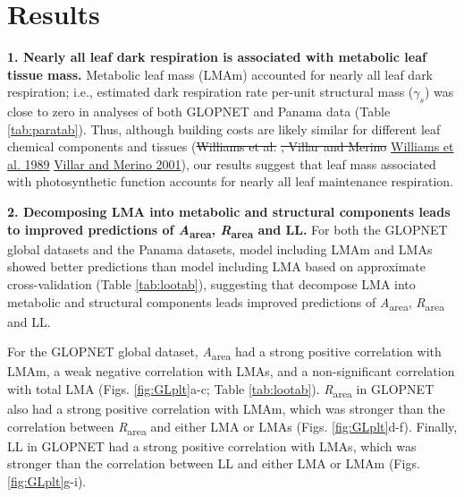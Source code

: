 \documentclass[
  12pt,
]{article}
\providecommand{\DIFaddtex}[1]{{\protect\color{blue}\uwave{#1}}} %
\providecommand{\DIFdeltex}[1]{{\protect\color{red}\sout{#1}}}                      %
\providecommand{\DIFaddbegin}{} %
\providecommand{\DIFaddend}{} %
\providecommand{\DIFdelbegin}{} %
\providecommand{\DIFdelend}{} %
\providecommand{\DIFadd}[1]{\texorpdfstring{\DIFaddtex{#1}}{#1}} %
\providecommand{\DIFdel}[1]{\texorpdfstring{\DIFdeltex{#1}}{}} %
\newcommand{\DIFscaledelfig}{0.5}
\newlength{\DIFdelgraphicswidth} %
\newlength{\DIFdelgraphicsheight} %
\newcommand{\DIFaddincludegraphics}[2][]{{\color{blue}\fbox{\DIFOincludegraphics[#1]{#2}}}} %
\newcommand{\DIFdelincludegraphics}[2][]{%
\sbox{\DIFdelgraphicsbox}{\DIFOincludegraphics[#1]{#2}}%
\settoboxwidth{\DIFdelgraphicswidth}{\DIFdelgraphicsbox} %
\settoboxtotalheight{\DIFdelgraphicsheight}{\DIFdelgraphicsbox} %
\scalebox{\DIFscaledelfig}{%
\parbox[b]{\DIFdelgraphicswidth}{\usebox{\DIFdelgraphicsbox}\\[-\baselineskip] \rule{\DIFdelgraphicswidth}{0em}}\llap{\resizebox{\DIFdelgraphicswidth}{\DIFdelgraphicsheight}{%
\setlength{\unitlength}{\DIFdelgraphicswidth}%
\begin{picture}(1,1)%
\thicklines\linethickness{2pt} %
{\color[rgb]{1,0,0}\put(0,0){\framebox(1,1){}}}%
{\color[rgb]{1,0,0}\put(0,0){\line( 1,1){1}}}%
{\color[rgb]{1,0,0}\put(0,1){\line(1,-1){1}}}%
\end{picture}%
}\hspace*{3pt}}} %
} %
\DeclareRobustCommand{\DIFaddbegin}{\DIFOaddbegin \let\includegraphics\DIFaddincludegraphics} %
\DeclareRobustCommand{\DIFaddend}{\DIFOaddend \let\includegraphics\DIFOincludegraphics} %
\DeclareRobustCommand{\DIFdelbegin}{\DIFOdelbegin \let\includegraphics\DIFdelincludegraphics} %
\DeclareRobustCommand{\DIFdelend}{\DIFOaddend \let\includegraphics\DIFOincludegraphics} %
\begin{document}
\hypertarget{results}{%
\section{Results}\label{results}}

\textbf{1. Nearly all leaf dark respiration is associated with metabolic leaf tissue mass.}
Metabolic leaf mass (LMAm) accounted for nearly all leaf dark respiration; i.e., estimated dark respiration rate per-unit structural mass (\(\gamma_s\)) was close to zero in analyses of both GLOPNET and Panama data (Table \ref{tab:paratab}).
Thus, although building costs are likely similar for different leaf chemical components and tissues (\DIFdelbegin \DIFdel{Williams et al. }\DIFdelend \protect\DIFdelbegin %
\DIFdel{, Villar and Merino }\DIFdelend \DIFaddbegin \hyperlink{ref-Williams1989}{Williams et al. 1989}\DIFadd{, }\DIFaddend \protect\DIFdelbegin %
\DIFdelend \DIFaddbegin \hyperlink{ref-Villar2001}{Villar and Merino 2001}\DIFaddend ), our results suggest that leaf mass associated with photosynthetic function accounts for nearly all leaf maintenance respiration.

\textbf{2. Decomposing LMA into metabolic and structural components leads to improved predictions of \emph{A}\textsubscript{area}, \emph{R}\textsubscript{area} and LL.}
For both the GLOPNET global datasets and the Panama datasets, model including LMAm and LMAs showed better predictions than model including LMA based on approximate cross-validation (Table \ref{tab:lootab}), suggesting that decompose LMA into metabolic and structural components leads improved predictions of \emph{A}\textsubscript{area}, \emph{R}\textsubscript{area} and LL.

For the GLOPNET global dataset, \emph{A}\textsubscript{area} had a strong positive correlation with LMAm, a weak negative correlation with LMAs, and a non-significant correlation with total LMA (Figs. \ref{fig:GLplt}a-c; Table \ref{tab:lootab}).
\emph{R}\textsubscript{area} in GLOPNET also had a strong positive correlation with LMAm, which was stronger than the correlation between \emph{R}\textsubscript{area} and either LMA or LMAs (Figs. \ref{fig:GLplt}d-f).
Finally, LL in GLOPNET had a strong positive correlation with LMAs, which was stronger than the correlation between LL and either LMA or LMAm (Figs. \ref{fig:GLplt}g-i).
\end{document}
